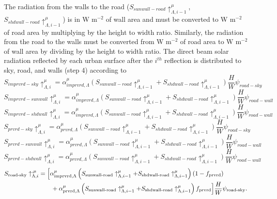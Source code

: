 \documentclass[12pt,authoryear]{elsarticle}
\numberwithin{equation}{section} %
\begin{document}
The radiation from the walls to the road ($S_{sunwall-road}\uparrow_{\Lambda,i-1}^{\mu}$, $S_{shdwall-road}\uparrow_{\Lambda,i-1}^{\mu}$) is in W m$^{-2}$ of wall area and must be converted to W m$^{-2}$ of road area by multiplying by the height to width ratio. Similarly, the radiation from the road to the walls must be converted from W m$^{-2}$ of road area to W m$^{-2}$ of wall area by dividing by the height to width ratio. The direct beam solar radiation reflected by each urban surface after the $i^{th}$ reflection is distributed to sky, road, and walls (step 4) according to
\begin{equation}
S_{imprvrd-sky}\uparrow_{\Lambda,i}^{\mu}=\alpha_{imprvrd,\Lambda}^{\mu}(S_{sunwall-road}\uparrow_{\Lambda,i-1}^{\mu}+S_{shdwall-road}\uparrow_{\Lambda,i-1}^{\mu})\frac{H}{W}\psi_{road-sky}
\end{equation}
\begin{equation}
S_{imprvrd-sunwall}\uparrow_{\Lambda,i}^{\mu}=\alpha_{imprvrd,\Lambda}^{\mu}(S_{sunwall-road}\uparrow_{\Lambda,i-1}^{\mu}+S_{shdwall-road}\uparrow_{\Lambda,i-1}^{\mu})\frac{H}{W}\psi_{road-wall}
\end{equation}
\begin{equation}
S_{imprvrd-shdwall}\uparrow_{\Lambda,i}^{\mu}=\alpha_{imprvrd,\Lambda}^{\mu}(S_{sunwall-road}\uparrow_{\Lambda,i-1}^{\mu}+S_{shdwall-road}\uparrow_{\Lambda,i-1}^{\mu})\frac{H}{W}\psi_{road-wall}
\end{equation}
\begin{equation}
S_{prvrd-sky}\uparrow_{\Lambda,i}^{\mu}=\alpha_{prvrd,\Lambda}^{\mu}(S_{sunwall-road}\uparrow_{\Lambda,i-1}^{\mu}+S_{shdwall-road}\uparrow_{\Lambda,i-1}^{\mu})\frac{H}{W}\psi_{road-sky}
\end{equation}
\begin{equation}
S_{prvrd-sunwall}\uparrow_{\Lambda,i}^{\mu}=\alpha_{prvrd,\Lambda}^{\mu}(S_{sunwall-road}\uparrow_{\Lambda,i-1}^{\mu}+S_{shdwall-road}\uparrow_{\Lambda,i-1}^{\mu})\frac{H}{W}\psi_{road-wall}
\end{equation}
\begin{equation}
S_{prvrd-shdwall}\uparrow_{\Lambda,i}^{\mu}=\alpha_{prvrd,\Lambda}^{\mu}(S_{sunwall-road}\uparrow_{\Lambda,i-1}^{\mu}+S_{shdwall-road}\uparrow_{\Lambda,i-1}^{\mu})\frac{H}{W}\psi_{road-wall}
\end{equation}
\begin{equation}
\begin{aligned}
S_{\mathrm{road\text{-}sky}}\uparrow_{\Lambda,i}^{,\mu}
&=\Bigl[\alpha_{\mathrm{imprvrd},\Lambda}^{\mu}\left(
S_{\mathrm{sunwall\text{-}road}}\uparrow_{\Lambda,i-1}^{\mu}+S_{\mathrm{shdwall\text{-}road}}\uparrow_{\Lambda,i-1}^{\mu}\right)(1-f_{\mathrm{prvrd}})\\
&\qquad+\alpha_{\mathrm{prvrd},\Lambda}^{\mu}\left(S_{\mathrm{sunwall\text{-}road}}\uparrow_{\Lambda,i-1}^{\mu}+S_{\mathrm{shdwall\text{-}road}}\uparrow_{\Lambda,i-1}^{\mu}\right)f_{\mathrm{prvrd}}\Bigr]\frac{H}{W}\psi_{\mathrm{road\text{-}sky}} .
\end{aligned}
\end{equation}
\end{document}
